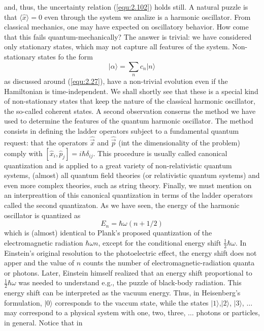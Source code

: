 and, thus, the uncertainty relation (\ref{equ:2.102}) holds
still. A natural puzzle is that $\langle \hat{x}\rangle  = 0$ even through
the system we analize is a harmonic oscillator. From
classical mechanics, one may have expected on oscillatory
behavior. How come that this fails quantum-mechanically? The
answer is trivial: we have considered only stationary
states, which may not capture all features of the system.
Non-stationary states fo the form
\begin{equation}
  \vert \alpha\rangle  = \sum_n c_n \vert n\rangle 
  \label{equ:2.105}
\end{equation}
as discussed around (\ref{equ:2.27}), have a non-trivial
evolution even if the Hamiltonian is time-independent. We
shall shortly see that these is a special kind of
non-stationary states that keep the nature of the classical
harmonic oscillator, the so-called coherent states.
A second observation conserns the method we have used to
determine the features of the quantum harmonic oscillator.
The method consists in defining the ladder operators subject
to a fundamental quantum request: that the operators
$\hat{\vec{x}}$ and $\hat{\vec{p}}$ (int the dimensionality
of the problem) comply with $[\hat{x}_i, \hat{p}_j] = i
\hbar \delta_{ij}$. This procedure is usually called
canonical quantization and is applied to a great variety of
non-relativistic quantum systems, (almost) all quantum field
theories (or relativistic quantum systems) and even more
complex theories, such as string theory.
Finally, we must mention on an interpreattion of this
canonical quantization in terms of the ladder operators
called the second quantizaton. As we have seen, the energy
of the harmonic oscillator is quantized as
$$
E_n = \hbar\omega(n + 1/2)
$$
which is (almost) identical to Plank's proposed quantization
of the electromagnetic radiation $\hbar\omega n$, except for
the conditional energy shift $\frac{1}{2}\hbar\omega$. In
Einstein's original resolution to the photoelectric effect,
the energy shift does not apper and the value of $n$ counts
the number of electromagnetic-radiation quanta or photons.
Later, Einstein himself realized that an energy shift
proportional to $\frac{1}{2} \hbar \omega$ was needed to
understand e.g., the puzzle of black-body radiation. This
energy shift can be interpreted as the vacuum energy. Thus,
in Heisenberg's formulation, $\vert 0\rangle $ corresponds to the vaccum
state, while the states $\vert 1\rangle $,$\vert 2\rangle $, $\vert 3\rangle $, $\ldots$ may
correspond to a physical system with one, two, three,
$\ldots$ photons or particles, in general. Notice that in
